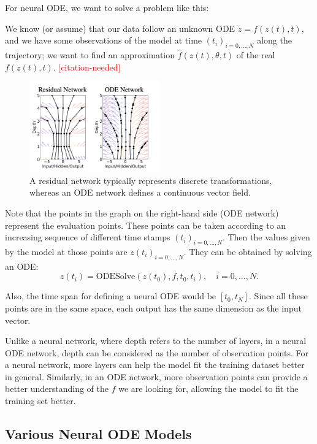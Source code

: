 \documentclass[a4paper,11pt,titlepage]{article}
\newcommand{\citationneeded}{\textcolor{red}{[citation-needed]}}
\theoremstyle{definition}
\theoremstyle{plain}
\theoremstyle{remark}
\begin{document}
For neural ODE, we want to solve a problem like this: 

We know (or assume) that our data follow an unknown ODE $\dot{z}=f(z(t),t)$, and we have some observations of the model at time $(t_i)_{i=0,\dots,N}$ along the trajectory; we want to find an approximation $\hat{f}(z(t),\theta,t)$ of the real $f(z(t),t)$. \citationneeded

\begin{figure}[htbp]
    \centering
    \includegraphics[width=0.5\textwidth]{report/figures/ResNetvsODENet.png}
    \caption{A residual network typically represents discrete transformations, whereas an ODE network defines a continuous vector field. \cite{chen2018neural}}
    \label{fig:enter-label}
\end{figure}

Note that the points in the graph on the right-hand side (ODE network) represent the evaluation points. These points can be taken according to an increasing sequence of different time stamps $(t_i)_{i=0,\dots,N}$. Then the values given by the model at those points are $z(t_i)_{i=0,\dots,N}$. They can be obtained by solving an ODE:
$$z(t_i)=\mathrm{ODESolve}(z(t_0),f,t_0,t_i),\quad i=0,\dots,N.$$

Also, the time span for defining a neural ODE would be $[t_0,t_N]$. Since all these points are in the same space, each output has the same dimension as the input vector.

Unlike a neural network, where depth refers to the number of layers, in a neural ODE network, depth can be considered as the number of observation points. For a neural network, more layers can help the model fit the training dataset better in general. Similarly, in an ODE network, more observation points can provide a better understanding of the $f$ we are looking for, allowing the model to fit the training set better.

\subsection{Various Neural ODE Models}
\end{document}
